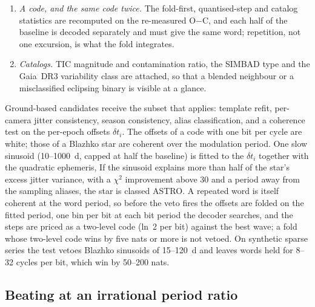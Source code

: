 \documentclass[final,5p]{elsarticle}
\newcommand{\oc}{O$-$C}
\begin{document}
\begin{enumerate}
\item \emph{A code, and the same code twice.} The fold-first, quantised-step and catalog statistics are recomputed on the re-measured \oc{}, and each half of the baseline is decoded separately and must give the same word; repetition, not one excursion, is what the fold integrates.
\item \emph{Catalogs.} TIC magnitude and contamination ratio, the SIMBAD type and the Gaia~DR3 variability class are attached, so that a blended neighbour or a misclassified eclipsing binary is visible at a glance.
\end{enumerate}
Ground-based candidates receive the subset that applies: template refit, per-camera jitter consistency, season consistency, alias classification, and a coherence test on the per-epoch offsets $\delta t_i$. The offsets of a code with one bit per cycle are white; those of a Blazhko star are coherent over the modulation period. One slow sinusoid (10--1000~d, capped at half the baseline) is fitted to the $\delta t_i$ together with the quadratic ephemeris, If the sinusoid explains more than half of the star's excess jitter variance, with a $\chi^2$ improvement above 30 and a period away from the sampling aliases, the star is classed ASTRO. A repeated word is itself coherent at the word period, so before the veto fires the offsets are folded on the fitted period, one bin per bit at each bit period the decoder searches, and the steps are priced as a two-level code (ln~2 per bit) against the best wave; a fold whose two-level code wins by five nats or more is not vetoed. On synthetic sparse series the test vetoes Blazhko sinusoids of 15--120~d and leaves words held for 8--32 cycles per bit, which win by 50--200 nats.

\subsection{Beating at an irrational period ratio}
\label{sec:beating}
\end{document}
